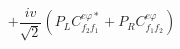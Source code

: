 %
\begin{dmath*}
%
  +  \frac{i v}{\sqrt{2}} \left(P_L C^{e \varphi  *}_{f_2 f_1} + P_R C^{e \varphi  }_{f_1 f_2}\right)
%
\end{dmath*}
%

